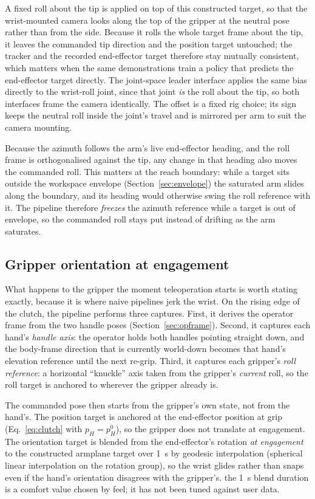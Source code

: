 A fixed roll about the tip is applied on top of this constructed target,
so that the wrist-mounted camera looks along the top of the gripper at
the neutral pose rather than from the side. Because it rolls the whole
target frame about the tip, it leaves the commanded tip direction and the
position target untouched; the tracker and the recorded end-effector
target therefore stay mutually consistent, which matters when the same
demonstrations train a policy that predicts the end-effector target
directly. The joint-space leader interface applies the same bias directly
to the wrist-roll joint, since that joint \emph{is} the roll about the
tip, so both interfaces frame the camera identically. The offset is a
fixed rig choice; its sign keeps the neutral roll inside the joint's
travel and is mirrored per arm to suit the camera mounting.

Because the azimuth follows the arm's live end-effector heading, and the
roll frame is orthogonalised against the tip, any change in that heading
also moves the commanded roll. This matters at the reach boundary: while
a target sits outside the workspace envelope
(Section~\ref{sec:envelope}) the saturated arm slides along the
boundary, and its heading would otherwise swing the roll reference with
it. The pipeline therefore \emph{freezes} the azimuth reference while a
target is out of envelope, so the commanded roll stays put instead of
drifting as the arm saturates.

\subsection{Gripper orientation at engagement}
\label{sec:engagement}

What happens to the gripper the moment teleoperation starts is worth
stating exactly, because it is where naive pipelines jerk the wrist.
On the rising edge of the clutch, the pipeline performs three captures.
First, it derives the operator frame from the two handle poses
(Section~\ref{sec:opframe}). Second, it captures each hand's
\emph{handle axis}: the operator holds both handles pointing straight
down, and the body-frame direction that is currently world-down becomes
that hand's elevation reference until the next re-grip. Third, it
captures each gripper's \emph{roll reference}: a horizontal ``knuckle''
axis taken from the gripper's \emph{current} roll, so the roll target is
anchored to wherever the gripper already is.

The commanded pose then starts from the gripper's own state, not from
the hand's. The position target is anchored at the end-effector position
at grip (Eq.~\eqref{eq:clutch} with \(p_H = p_H^0\)), so the gripper
does not translate at engagement. The orientation target is blended from
the end-effector's rotation \emph{at engagement} to the constructed
armplane target over \SI{1}{s} by geodesic interpolation (spherical
linear interpolation on the rotation group), so the wrist glides rather
than snaps even if the hand's orientation disagrees with the gripper's.
\unjustified{} the \SI{1}{s} blend duration is a comfort
value chosen by feel; it has not been tuned against user data.

